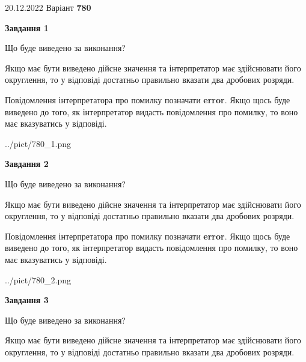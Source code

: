 \documentclass[12pt, ukrainian]{article}
\begin{document}
{20.12.2022 Варіант \No \textbf { 780 }\par}
{
\begin {Large}

{\begin {center}\textbf{Завдання 1}\end {center}}\par
Що буде виведено за виконання? \par

Якщо має бути виведено дійсне значення та інтерпретатор має здійснювати його округлення, 
то у відповіді достатньо правильно вказати два дробових розряди.

Повідомлення інтерпретатора про помилку позначати \textbf{error}.
Якщо щось буде виведено до того, як інтерпретатор видасть повідомлення про помилку, 
то воно має вказуватись у відповіді. \par

\begin{center}
	{../pict/780_1.png}
\end{center}
\newpage

{\begin {center}\textbf{Завдання 2}\end {center}}\par
Що буде виведено за виконання? \par

Якщо має бути виведено дійсне значення та інтерпретатор має здійснювати його округлення, 
то у відповіді достатньо правильно вказати два дробових розряди.

Повідомлення інтерпретатора про помилку позначати \textbf{error}.
Якщо щось буде виведено до того, як інтерпретатор видасть повідомлення про помилку, 
то воно має вказуватись у відповіді. \par

\begin{center}
	{../pict/780_2.png}
\end{center}
\newpage

{\begin {center}\textbf{Завдання 3}\end {center}}\par
Що буде виведено за виконання? \par

Якщо має бути виведено дійсне значення та інтерпретатор має здійснювати його округлення, 
то у відповіді достатньо правильно вказати два дробових розряди.


\end{Large}}
\end{document}
